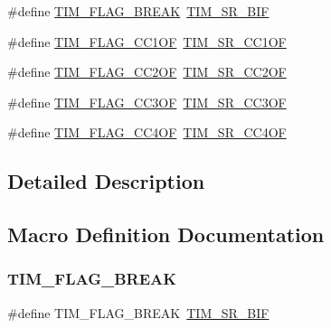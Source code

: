 \begin{DoxyCompactItemize}
\item 
\#define \hyperlink{group___t_i_m___flag__definition_ga01aedbe0676064a4d47dee474ddb863d}{T\+I\+M\+\_\+\+F\+L\+A\+G\+\_\+\+B\+R\+E\+AK}~\hyperlink{group___peripheral___registers___bits___definition_ga6d52cd5a57c9a26b0d993c93d9875097}{T\+I\+M\+\_\+\+S\+R\+\_\+\+B\+IF}
\item 
\#define \hyperlink{group___t_i_m___flag__definition_ga38dfb7d1ed00af77d70bc3be28500108}{T\+I\+M\+\_\+\+F\+L\+A\+G\+\_\+\+C\+C1\+OF}~\hyperlink{group___peripheral___registers___bits___definition_ga819c4b27f8fa99b537c4407521f9780c}{T\+I\+M\+\_\+\+S\+R\+\_\+\+C\+C1\+OF}
\item 
\#define \hyperlink{group___t_i_m___flag__definition_ga4df0c71d3e695c214d49802942e04590}{T\+I\+M\+\_\+\+F\+L\+A\+G\+\_\+\+C\+C2\+OF}~\hyperlink{group___peripheral___registers___bits___definition_ga3b7798da5863d559ea9a642af6658050}{T\+I\+M\+\_\+\+S\+R\+\_\+\+C\+C2\+OF}
\item 
\#define \hyperlink{group___t_i_m___flag__definition_gac81f24eaffdf83c2db9d2e6078a00919}{T\+I\+M\+\_\+\+F\+L\+A\+G\+\_\+\+C\+C3\+OF}~\hyperlink{group___peripheral___registers___bits___definition_gaf7a2d4c831eb641ba082156e41d03358}{T\+I\+M\+\_\+\+S\+R\+\_\+\+C\+C3\+OF}
\item 
\#define \hyperlink{group___t_i_m___flag__definition_gafc8b04654766d98ba2c6fed601895a20}{T\+I\+M\+\_\+\+F\+L\+A\+G\+\_\+\+C\+C4\+OF}~\hyperlink{group___peripheral___registers___bits___definition_ga81ba979e8309b66808e06e4de34bc740}{T\+I\+M\+\_\+\+S\+R\+\_\+\+C\+C4\+OF}
\end{DoxyCompactItemize}


\subsection{Detailed Description}


\subsection{Macro Definition Documentation}
\mbox{\label{group___t_i_m___flag__definition_ga01aedbe0676064a4d47dee474ddb863d}} 
\subsubsection{\texorpdfstring{T\+I\+M\+\_\+\+F\+L\+A\+G\+\_\+\+B\+R\+E\+AK}{TIM\_FLAG\_BREAK}}
{\footnotesize\ttfamily \#define T\+I\+M\+\_\+\+F\+L\+A\+G\+\_\+\+B\+R\+E\+AK~\hyperlink{group___peripheral___registers___bits___definition_ga6d52cd5a57c9a26b0d993c93d9875097}{T\+I\+M\+\_\+\+S\+R\+\_\+\+B\+IF}}

